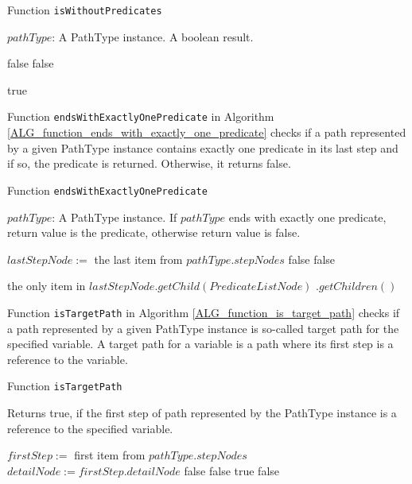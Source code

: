 \begin{algorithm}
\caption{Function \texttt{isWithoutPredicates}}
\label{ALG_function_is_without_predicates}
\begin{algorithmic}[1]
\REQUIRE $pathType$: A PathType instance.
\ENSURE A boolean result.

		\RETURN false
	\ENDIF
			\RETURN false
		\ENDIF
	\ENDIF
\ENDFOR

\RETURN true
\end{algorithmic}
\end{algorithm}

Function \texttt{endsWithExactlyOnePredicate} in Algorithm \ref{ALG_function_ends_with_exactly_one_predicate} checks if a path represented by a given PathType instance contains exactly one predicate in its last step and if so, the predicate is returned. Otherwise, it returns false.

\begin{algorithm}
\caption{Function \texttt{endsWithExactlyOnePredicate}}
\label{ALG_function_ends_with_exactly_one_predicate}
\begin{algorithmic}[1]
\REQUIRE $pathType$: A PathType instance.
\ENSURE If $pathType$ ends with exactly one predicate, return value is the predicate, otherwise return value is false.

\STATE $lastStepNode :=$ the last item from $pathType.stepNodes$
	\RETURN false
\ENDIF
{}
	\RETURN false
\ENDIF

\RETURN the only item in $lastStepNode.getChild(PredicateListNode)$ $.getChildren()$
\end{algorithmic}
\end{algorithm}

Function \texttt{isTargetPath} in Algorithm \ref{ALG_function_is_target_path} checks if a path represented by a given PathType instance is so-called target path for the specified variable. A target path for a variable is a path where its first step is a reference to the variable.

\begin{algorithm}
\caption{Function \texttt{isTargetPath}}
\label{ALG_function_is_target_path}
\begin{algorithmic}[1]
\ENSURE Returns true, if the first step of path represented by the PathType instance is a reference to the specified variable.

\STATE $firstStep :=$ first item from  $pathType.stepNodes$
\STATE $detailNode := firstStep.detailNode$
	\RETURN false
\ENDIF
{}
	\RETURN false
\ENDIF
{}
	\RETURN true
\ELSE
	\RETURN false
\ENDIF
\end{algorithmic}
\end{algorithm}

